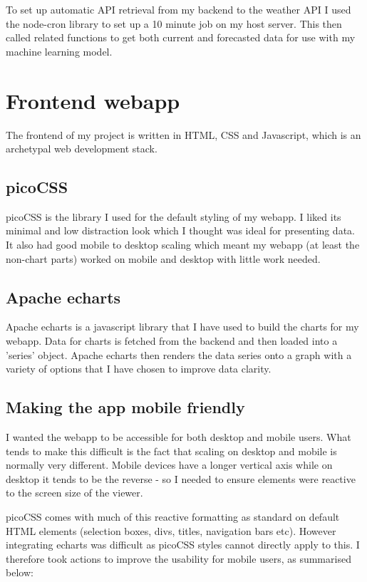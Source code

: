 To set up automatic API retrieval from my backend to the weather API I used the
node-cron library to set up a 10 minute job on my host server. This then called
related functions to get both current and forecasted data for use with my
machine learning model.

\section{Frontend webapp}\label{sec:front-end}

The frontend of my project is written in HTML, CSS and Javascript, which is an
archetypal web development stack.

\subsection{picoCSS}

picoCSS is the library I used for the default styling of my webapp. I liked its
minimal and low distraction look which I thought was ideal for presenting data.
It also had good mobile to desktop scaling which meant my webapp (at least the
non-chart parts) worked on mobile and desktop with little work needed.

\subsection{Apache echarts}

Apache echarts is a javascript library that I have used to build the charts for
my webapp. Data for charts is fetched from the backend and then loaded into a
'series' object. Apache echarts then renders the data series onto a graph with a
variety of options that I have chosen to improve data clarity.

\subsection{Making the app mobile friendly}

I wanted the webapp to be accessible for both desktop and mobile users. What
tends to make this difficult is the fact that scaling on desktop and mobile is
normally very different. Mobile devices have a longer vertical axis while on
desktop it tends to be the reverse - so I needed to ensure elements were
reactive to the screen size of the viewer.

picoCSS comes with much of this reactive formatting as standard on default HTML
elements (selection boxes, divs, titles, navigation bars etc). However
integrating echarts was difficult as picoCSS styles cannot directly apply to
this. I therefore took actions to improve the usability for mobile users, as
summarised below:

